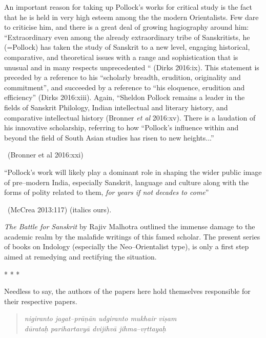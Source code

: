 \begin{myquote}
An important reason for taking up Pollock’s works for critical study is the fact that he is held in very high esteem among the the modern Orientalists. Few dare to criticise him, and there is a great deal of growing hagiography around him: “Extraordinary even among the already extraordinary tribe of Sanskritists, he (=Pollock) has taken the study of Sanskrit to a new level, engaging historical, comparative, and theoretical issues with a range and sophistication that is unusual and in many respects unprecedented “ (Dirks 2016:ix). This statement is preceded by a reference to his “scholarly breadth, erudition, originality and commitment”, and succeeded by a reference to “his eloquence, erudition and efficiency” (Dirks 2016:xiii). Again, “Sheldon Pollock remains a leader in the fields of Sanskrit Philology, Indian intellectual and literary history, and comparative intellectual history (Bronner \textit{et al} 2016:xv). There is a laudation of his innovative scholarship, referring to how “Pollock’s influence within and beyond the field of South Asian studies has risen to new heights...” 

~\hfill (Bronner et al 2016:xxi)
\end{myquote}

\vskip -5pt

\begin{myquote}
“Pollock’s work will likely play a dominant role in shaping the wider public image of pre–modern India, especially Sanskrit, language and culture along with the forms of polity related to them, \textit{for years if not decades to come}” 

~\hfill (McCrea 2013:117) (italics ours).
\end{myquote}

\textit{The Battle for Sanskrit} by Rajiv Malhotra outlined the immense damage to the academic realm by the malafide writings of this famed scholar. The present series of books on Indology (especially the Neo–Orientalist type), is only a first step aimed at remedying and rectifying the situation.

\begin{center}
* * *
\end{center}

Needless to say, the authors of the papers here hold themselves responsible for their respective papers.

\begin{verse}
\textit{nigiranto jagat–prāṇān udgiranto mukhair viṣam}  \\\textit{dūrataḥ parihartavyā dvijihvā jihma–vṛttayaḥ} 
\end{verse}

